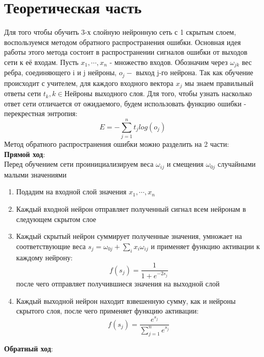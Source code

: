\documentclass{article}
\begin{document}
\section{Теоретическая часть}
\newcommand{\partFunc}{1+e^{-2s_j}}
\newcommand{\dd}[2]{\dfrac{\partial#1}{\partial#2}}
Для того чтобы обучить 3-х слойную нейронную сеть с 1 скрытым слоем, воспользуемся методом обратного распространения ошибки. Основная идея работы этого метода состоит в распространении сигналов ошибки от выходов сети к её входам. Пусть $x_1,\cdots,x_n$ - множество входов. Обозначим через $\omega_{jk}$ вес ребра, соединяющего i и j нейроны, $o_j - $ выход j-го нейрона. Так как обучение происходит с учителем, для каждого входного вектора $x_j$ мы знаем правильный ответы сети $t_k, k \in \text{Нейроны выходного слоя}$. Для того, чтобы узнать насколько ответ сети отличается от ожидаемого, будем использовать функцию ошибки - перекрестная энтропия:
\begin{equation}
\label{eq: 1}
E=-\sum_{j=1}^{n}t_jlog(o_j)
\end{equation}
Метод обратного распространения ошибки можно разделить на 2 части:
\vspace{3mm} \\
\textbf{Прямой ход}: \\
Перед обучением сети проинициализируем веса $\omega_{ij}$ и смещения $\omega_{0j}$ случайными малыми значениями
\begin{enumerate}
	\item Подадим на входной слой значения $x_1,\cdots,x_n$
	\item Каждый входной нейрон отправляет полученный сигнал всем нейронам в следующем скрытом слое
	\item Каждый скрытый нейрон суммирует полученные значения, умножает на соответствующие веса
	$s_{j} = \omega_{0j} + \sum_ix_i\omega_{ij}$ и применяет функцию активации к каждому нейрону:
	$$ %
	f(s_j)=\dfrac{1}{\partFunc} 
	$$
	после чего отправляет получившиеся значения на выходной слой
	\item Каждый выходной нейрон находит взвешенную сумму, как и нейроны скрытого слоя, после чего применяет функцию активации:
	$$
	f(s_j) = \dfrac{e^{s_j}}{\sum_{j=1}^{n}e^{s_j}}
	$$
\end{enumerate}
\textbf{Обратный ход}:
\end{document}
